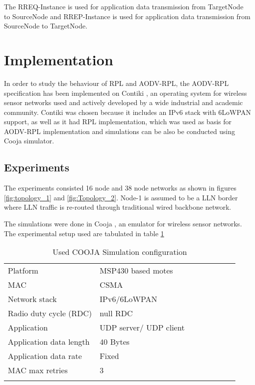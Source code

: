 \documentclass[conference, letterpaper]{IEEEtran}
\begin{document}
The RREQ-Instance is used for application data transmission from TargetNode to
SourceNode and RREP-Instance is used for application data transmission from
SourceNode to TargetNode.

\section{Implementation}\label{Section.IV}
In order to study the behaviour of RPL and AODV-RPL, the AODV-RPL specification
has been implemented on Contiki \cite{contiki}, an operating system for
wireless sensor networks used and actively developed by a wide industrial and
academic community. Contiki was chosen because it includes an IPv6 stack with
6LoWPAN support, as well as it had RPL implementation, which was used as
basis for  AODV-RPL implementation and simulations can be also be conducted
using Cooja simulator.

\subsection{Experiments} 
The experiments consisted 16 node and 38 node networks as shown in figures
\ref{fig:topology_1} and \ref{fig:Topology_2}. Node-1 is assumed to be a LLN
border where LLN traffic is re-routed through traditional wired backbone
network.

The simulations were done in Cooja \cite{contiki}, an emulator for
wireless sensor networks. The experimental setup used are
tabulated in table \ref{tab1:simsetup}
\begin{table}[h!]
\centering
\begin{tabular}{llllllll}
\toprule 
\midrule Platform & MSP430 based motes \\ MAC & CSMA  \\ Network stack
& IPv6/6LoWPAN \\ Radio duty cycle (RDC) & null RDC \\  Application & UDP
server/ UDP client\\  Application data length & 40 Bytes \\ Application data
rate & Fixed \\  MAC max retries & 3\\ \bottomrule \\ \end{tabular}
\caption{Used COOJA Simulation configuration } \label{tab1:simsetup}
\end{table}
\end{document}
